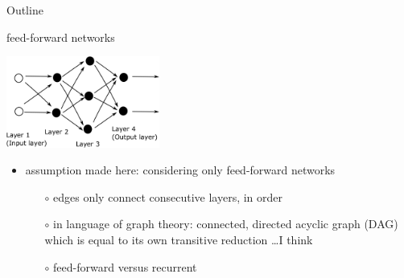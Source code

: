 \documentclass[xcolor={svgnames},
               hyperref={colorlinks,citecolor=DeepPink4,linkcolor=FireBrick,urlcolor=Maroon}]
               {beamer}
\begin{document}
\begin{frame}{Outline}
\end{frame}


\begin{frame}{feed-forward networks}

\begin{center}
\includegraphics[height=30mm]{figs/network}
\end{center}

\begin{itemize}
\item assumption made here: considering only \alert{feed-forward} networks
    \begin{itemize}
    \item[$\circ$] edges only connect consecutive layers, in order
    \item[$\circ$] in language of graph theory: connected, directed acyclic graph (DAG) which is equal to its own transitive reduction \dots I think
    \item[$\circ$] \alert{feed-forward} versus \alert{recurrent}
    \end{itemize}
\end{itemize}
\end{frame}
\end{document}
